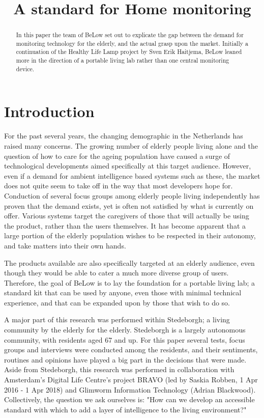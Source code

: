 \documentclass{below-ext}
\title{A standard for Home monitoring}
\author{
  \vspace{-1.5em} 
  \alignauthor{
  	\textbf{Patrick Hendriks}\\
  	\email{patrick.hendriks@hva.nl}
  }
  \vfil
  \alignauthor{
  	\textbf{Mats Otten}\\
  	\email{mats.otten@hva.nl}
  }
  \vfil
  \alignauthor{
  	\textbf{Suzanne Peerdeman}\\
  	\email{suzanne.peerdeman@hva.nl}
  }
  \vfil
  \alignauthor{
  	\textbf{Hogeschool van Amsterdam}\\
  	\affaddr{Wibautstraat 2-4}\\
  	\affaddr{1091 GM, Amsterdam}\\
  }
  \vfil
  \alignauthor{
  	\textbf{Glimworm IT BV}\\
  	\affaddr{Kattenburgerstraat 5}\\
  	\affaddr{1018 JA Amsterdam}\\
  }
}
\begin{document}
\maketitle

\begin{abstract}
In this paper the team of BeLow set out to explicate the gap between the demand for monitoring technology for the elderly, and the actual grasp upon the market. Initially a continuation of the Healthy Life Lamp project by Sven Erik Haitjema, BeLow leaned more in the direction of a portable living lab rather than one central monitoring device. 
\end{abstract}

\section{Introduction}
For the past several years, the changing demographic in the Netherlands has raised many concerns. The growing number of elderly people living alone and the question of how to care for the ageing population have caused a surge of technological developments aimed specifically at this target audience. However, even if a demand for ambient intelligence based systems such as these, the market does not quite seem to take off in the way that most developers hope for. Conduction of several focus groups among elderly people living independently has proven that the demand exists, yet is often not satisfied by what is currently on offer. Various systems target the caregivers of those that will actually be using the product, rather than the users themselves. It has become apparent that a large portion of the elderly population wishes to be respected in their autonomy, and take matters into their own hands.

The products available are also specifically targeted at an elderly audience, even though they would be able to cater a much more diverse group of users. Therefore, the goal of BeLow is to lay the foundation for a portable living lab; a standard kit that can be used by anyone, even those with minimal technical experience, and that can be expanded upon by those that wish to do so.

A major part of this research was performed within Stedeborgh; a living community by the elderly for the elderly. Stedeborgh is a largely autonomous community, with residents aged 67 and up. For this paper several tests, focus groups and interviews were conducted among the residents, and their sentiments, routines and opinions have played a big part in the decisions that were made. Aside from Stedeborgh, this research was performed in collaboration with Amsterdam's Digital Life Centre's project BRAVO (led by Saskia Robben, 1 Apr 2016 - 1 Apr 2018) and Glimworm Information Technology (Adrian Blackwood). Collectively, the question we ask ourselves is: "How can we develop an accessible standard with which to add a layer of intelligence to the living environment?" 
\end{document}
